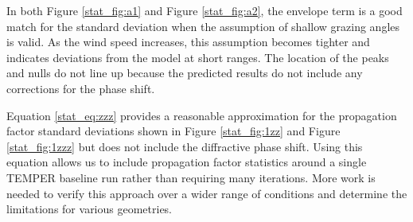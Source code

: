 In both Figure \ref{stat_fig:a1} and Figure \ref{stat_fig:a2}, the envelope term is a good match for the standard deviation when the assumption of shallow grazing angles is valid. As the wind speed increases, this assumption becomes tighter and indicates deviations from the model at short ranges. The location of the peaks and nulls do not line up because the predicted results do not include any corrections for the phase shift. 

Equation \ref {stat_eq:zzz} provides a reasonable approximation for the propagation factor standard deviations shown in Figure \ref{stat_fig:1zz} and Figure \ref{stat_fig:1zzz} but does not include the diffractive phase shift. Using this equation allows us to include propagation factor statistics around a single TEMPER baseline run rather than requiring many iterations. More work is needed to verify this approach over a wider range of conditions and determine the limitations for various geometries.